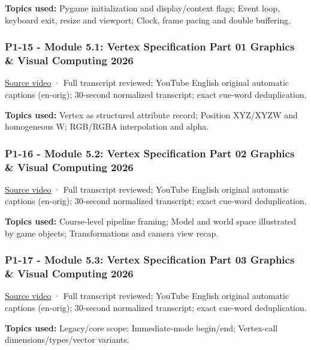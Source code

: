 \textbf{Topics used:} Pygame initialization and display/context flags; Event loop, keyboard exit, resize and viewport; Clock, frame pacing and double buffering.

\subsubsection{P1-15 - Module 5.1: Vertex Specification Part 01 Graphics \& Visual Computing 2026}\label{04-visual-computing-ii-ch036-p1-15---module-5.1-vertex-specification-part-01-graphics-visual-computing-2026}

\href{https://www.youtube.com/watch?v=llQ74GoG1po}{Source video} · Full transcript reviewed; YouTube English original automatic captions (en-orig); 30-second normalized transcript; exact cue-word deduplication.

\textbf{Topics used:} Vertex as structured attribute record; Position XYZ/XYZW and homogeneous W; RGB/RGBA interpolation and alpha.

\subsubsection{P1-16 - Module 5.2: Vertex Specification Part 02 Graphics \& Visual Computing 2026}\label{04-visual-computing-ii-ch036-p1-16---module-5.2-vertex-specification-part-02-graphics-visual-computing-2026}

\href{https://www.youtube.com/watch?v=wl-w5PZfmII}{Source video} · Full transcript reviewed; YouTube English original automatic captions (en-orig); 30-second normalized transcript; exact cue-word deduplication.

\textbf{Topics used:} Course-level pipeline framing; Model and world space illustrated by game objects; Transformations and camera view recap.

\subsubsection{P1-17 - Module 5.3: Vertex Specification Part 03 Graphics \& Visual Computing 2026}\label{04-visual-computing-ii-ch036-p1-17---module-5.3-vertex-specification-part-03-graphics-visual-computing-2026}

\href{https://www.youtube.com/watch?v=QGwjwKvDF0I}{Source video} · Full transcript reviewed; YouTube English original automatic captions (en-orig); 30-second normalized transcript; exact cue-word deduplication.

\textbf{Topics used:} Legacy/core scope; Immediate-mode begin/end; Vertex-call dimensions/types/vector variants.


